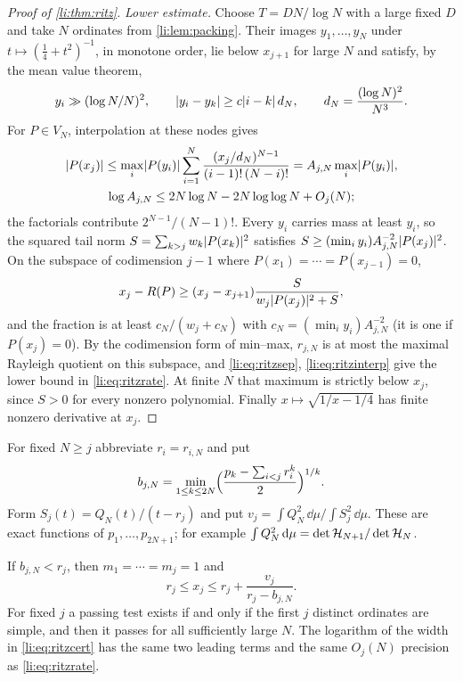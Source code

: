 \begin{proof}[Proof of \cref{li:thm:ritz}]
\emph{Lower estimate.} Choose $T=DN/\log N$ with a large fixed $D$ and take $N$ ordinates from \cref{li:lem:packing}.
Their images $y_1,\dots,y_N$ under $t\mapsto(\frac14+t^2)^{-1}$, in monotone order, lie below
$x_{j+1}$ for large $N$ and satisfy, by the mean value theorem,
\begin{equation}\label{li:eq:ritzsep}
 y_i\gg(\log N/N)^2,\qquad\lvert y_i-y_k\rvert\ge c\lvert i-k\rvert\,d_N,\qquad d_N=\frac{(\log N)^2}{N^3}.
\end{equation}
For $P\in V_N$, interpolation at these nodes gives
\begin{equation}\label{li:eq:ritzinterp}
\begin{gathered}
 \lvert P(x_j)\rvert\le\max_i\lvert P(y_i)\rvert\sum_{i=1}^N\frac{(x_j/d_N)^{N-1}}{(i-1)!\,(N-i)!}
 =A_{j,N}\max_i\lvert P(y_i)\rvert,\\
 \log A_{j,N}\le2N\log N-2N\log\log N+O_j(N);
\end{gathered}
\end{equation}
the factorials contribute $2^{N-1}/(N-1)!$. Every $y_i$ carries mass at least $y_i$, so the squared
tail norm $S=\sum_{k>j}w_k\lvert P(x_k)\rvert^2$ satisfies $S\ge(\min_iy_i)A_{j,N}^{-2}\lvert P(x_j)\rvert^2$.
On the subspace of codimension $j-1$ where $P(x_1)=\cdots=P(x_{j-1})=0$,
\[
 x_j-R(P)\ge(x_j-x_{j+1})\frac S{w_j\lvert P(x_j)\rvert^2+S},
\]
and the fraction is at least $c_N/(w_j+c_N)$ with $c_N=(\min_iy_i)A_{j,N}^{-2}$ (it is one if
$P(x_j)=0$). By the codimension form of min--max, $r_{j,N}$ is at most the maximal Rayleigh
quotient on this subspace, and \eqref{li:eq:ritzsep}, \eqref{li:eq:ritzinterp} give the lower bound
in \eqref{li:eq:ritzrate}. At finite $N$ that maximum is strictly below $x_j$, since $S>0$ for every
nonzero polynomial. Finally $x\mapsto\sqrt{1/x-1/4}$ has finite nonzero derivative at $x_j$.
\end{proof}

For fixed $N\ge j$ abbreviate $r_i=r_{i,N}$ and put
\begin{equation}\label{li:eq:septest}
 b_{j,N}=\min_{1\le k\le2N}\Bigl(\frac{p_k-\sum_{i<j}r_i^k}2\Bigr)^{1/k}.
\end{equation}
Form $S_j(t)=Q_N(t)/(t-r_j)$ and put $v_j=\int Q_N^2\,\dd\mu\big/\int S_j^2\,\dd\mu$. These are
exact functions of $p_1,\dots,p_{2N+1}$; for example
$\int Q_N^2\,\mathrm{d}\mu=\det\mathcal{H}_{N+1}/\det\mathcal{H}_N$.

\begin{theorem}\label{li:thm:ritzcert}
If $b_{j,N}<r_j$, then $m_1=\cdots=m_j=1$ and
\begin{equation}\label{li:eq:ritzcert}
 r_j\le x_j\le r_j+\frac{v_j}{r_j-b_{j,N}} .
\end{equation}
For fixed $j$ a passing test exists if and only if the first $j$ distinct ordinates are simple,
and then it passes for all sufficiently large $N$. The logarithm of the width in
\eqref{li:eq:ritzcert} has the same two leading terms and the same $O_j(N)$ precision as
\eqref{li:eq:ritzrate}.
\end{theorem}

